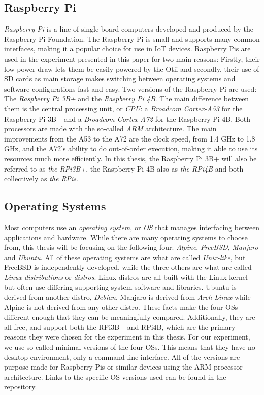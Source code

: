 \subsection*{Raspberry Pi}
\textit{Raspberry Pi} is a line of single-board computers developed and produced by the Raspberry Pi Foundation\cite{raspberry_pi_website}. The Raspberry Pi is small and supports many common interfaces, making it a popular choice for use in IoT devices\cite{zhao2015exploring}. Raspberry Pis are used in the experiment presented in this paper for two main reasons: Firstly, their low power draw lets them be easily powered by the Otii and secondly, their use of SD cards as main storage makes switching between operating systems and software configurations fast and easy. Two versions of the Raspberry Pi are used: The \textit{Raspberry Pi 3B+} and the \textit{Raspberry Pi 4B}. The main difference between them is the central processing unit, or \textit{CPU}: a \textit{Broadcom Cortex-A53} for the Raspberry Pi 3B+ and a \textit{Broadcom Cortex-A72} for the Raspberry Pi 4B. Both processors are made with the so-called \textit{ARM} architecture. The main improvements from the A53 to the A72 are the clock speed, from 1.4 GHz to 1.8 GHz, and the A72's ability to do out-of-order execution, making it able to use its resources much more efficiently. In this thesis, the Raspberry Pi 3B+ will also be referred to as \textit{the RPi3B+}, the Raspberry Pi 4B also as \textit{the RPi4B} and both collectively as \textit{the RPis}.

\subsection*{Operating Systems}
Most computers use an \textit{operating system}, or \textit{OS} that manages interfacing between applications and hardware. While there are many operating systems to choose from, this thesis will be focusing on the following four: \textit{Alpine}\cite{alpine_website}, \textit{FreeBSD}\cite{freebsd_website}, \textit{Manjaro}\cite{manjaro_website} and \textit{Ubuntu}\cite{ubuntu_website}. All of these operating systems are what are called \textit{Unix-like}, but FreeBSD is independently developed, while the three others are what are called \textit{Linux distributions} or \textit{distros}. Linux distros are all built with the Linux kernel but often use differing supporting system software and libraries. Ubuntu is derived from another distro, \textit{Debian}, Manjaro is derived from \textit{Arch Linux} while Alpine is not derived from any other distro. These facts make the four OSs different enough that they can be meaningfully compared. Additionally, they are all free, and support both the RPi3B+ and RPi4B, which are the primary reasons they were chosen for the experiment in this thesis. For our experiment, we use so-called minimal versions of the four OSs. This means that they have no desktop environment, only a command line interface. All of the versions are purpose-made for Raspberry Pis or similar devices using the ARM processor architecture. Links to the specific OS versions used can be found in the repository.

